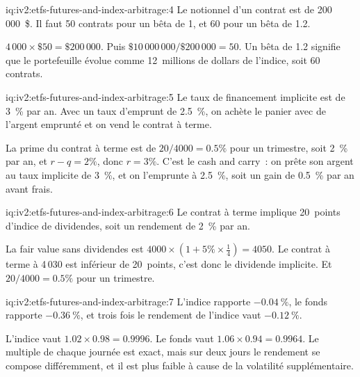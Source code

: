 \begin{solution}{iq:iv2:etfs-futures-and-index-arbitrage:4}
Le notionnel d'un contrat est de 200\,000~\$. Il faut 50 contrats pour un bêta de 1, et 60 pour un bêta de 1.2.

$4\,000 \times \$50 = \$200\,000$. Puis $\$10\,000\,000/\$200\,000 = 50$. Un bêta de 1.2 signifie que le portefeuille évolue comme 12~millions de dollars de l'indice, soit 60 contrats.

\end{solution}

\begin{solution}{iq:iv2:etfs-futures-and-index-arbitrage:5}
Le taux de financement implicite est de 3~\% par an. Avec un taux d'emprunt de 2.5~\%, on achète le panier avec de l'argent emprunté et on vend le contrat à terme.

La prime du contrat à terme est de $20/4000 = 0.5\%$ pour un trimestre, soit 2~\% par an, et $r - q = 2\%$, donc $r = 3\%$. C'est le cash and carry~: on prête son argent au taux implicite de 3~\%, et on l'emprunte à 2.5~\%, soit un gain de 0.5~\% par an avant frais.

\end{solution}

\begin{solution}{iq:iv2:etfs-futures-and-index-arbitrage:6}
Le contrat à terme implique 20~points d'indice de dividendes, soit un rendement de 2~\% par an.

La fair value sans dividendes est $4000 \times (1 + 5\% \times \tfrac14) = 4050$. Le contrat à terme à 4\,030 est inférieur de 20~points, c'est donc le dividende implicite. Et $20/4000 = 0.5\%$ pour un trimestre.

\end{solution}

\begin{solution}{iq:iv2:etfs-futures-and-index-arbitrage:7}
L'indice rapporte $-0.04~\%$, le fonds rapporte $-0.36~\%$, et trois fois le rendement de l'indice vaut $-0.12~\%$.

L'indice vaut $1.02 \times 0.98 = 0.9996$. Le fonds vaut $1.06 \times 0.94 = 0.9964$. Le multiple de chaque journée est exact, mais sur deux jours le rendement se compose différemment, et il est plus faible à cause de la volatilité supplémentaire.

\end{solution}

